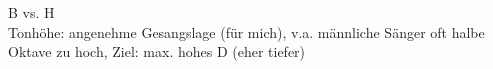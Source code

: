 \vspace*{\fill}
B vs. H \\

Tonhöhe: angenehme Gesangslage (für mich), v.a. männliche Sänger oft halbe Oktave zu hoch, Ziel: max. hohes D (eher tiefer)



\vspace*{\fill}
\pagebreak